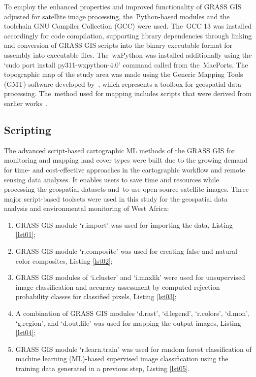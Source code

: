\documentclass[coasts,article,accept,pdftex,oneauthor]{Definitions/mdpi}
\begin{document}
To employ the enhanced properties and improved functionality of GRASS GIS adjusted for satellite image processing, the~Python-based modules and the toolchain GNU Compiler Collection (GCC) {were used}. The~GCC 13 was installed accordingly for code compilation, supporting library dependencies through linking and conversion of GRASS GIS scripts into the binary executable format for assembly into  executable files. The~wxPython was installed additionally using the `sudo port install py311-wxpython-4.0' {command called} from the~MacPorts. The topographic map of the study area was made using the Generic Mapping Tools (GMT) software developed by~\cite{Wessel}, {which represents a toolbox for geospatial data processing}. The~method{ }used for mapping {includes} scripts {that }were derived from earlier works~\cite{Lemenkova202217,Lemenkova202212,Lemenkova202203}. 

\subsection{Scripting}
The advanced script-based cartographic ML methods of {the }GRASS GIS for monitoring and mapping land cover types were built due to the growing demand for time- and cost-effective approaches in the cartographic workflow and remote sensing data analyses{. It enables} users to save time and resources while processing {the }geospatial datasets and~{to }use open-source satellite images. {Three} major script-based toolsets were used in this study for the geospatial data analysis and environmental monitoring of West Africa:

 \begin{enumerate}
        \item GRASS GIS module `r.import' was used for importing the data, Listing \ref{lst01}; 
        \item GRASS GIS module `r.composite' was used for creating false and natural color composites, Listing \ref{lst02}; 
        \item GRASS GIS {modules} of `i.cluster' and `i.maxlik'  were used for unsupervised image classification and accuracy assessment {by} computed rejection probability classes for classified pixels, Listing \ref{lst03};  
         \item A combination of GRASS GIS modules `d.rast', `d.legend', `r.colors', `d.mon', `g.region', and `d.out.file' was used for mapping the output images, Listing \ref{lst04}; 
        \item GRASS GIS {module} `r.learn.train' was used for random forest classification of machine learning (ML)-based supervised image classification using the training data generated in a previous step, Listing \ref{lst05}. 
  \end{enumerate}
  
\end{document}
